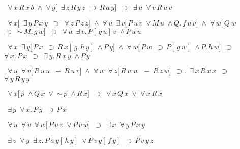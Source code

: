 \begin{description}
\item[\parbox{\textwidth}{X2114\index{X2114@X2114, {\bf Theorem}} }] \texttt{$ $ $\forall \,x \,R \,x \,b $ $\land $ $\forall \,y [ $ $\exists \,z \,R \,y \,z $ $\supset \,R \,a \,y ] $ $\supset $ $\exists \,u $ $\forall \,v \,R \,u \,v$}


\item[\parbox{\textwidth}{X2115\index{X2115@X2115, {\bf Theorem}} }] \texttt{$ $ $\forall \,x [ $ $\exists \,y \,P \,x \,y $ $\supset $ $\forall \,z \,P \,z \,z ] $ $\land $ $\forall \,u $ $\exists \,v [ \,P \,u \,v $ $\lor \,M \,u $ $\land \,Q . \,f \,u \,v ] $ $\land $ $\forall \,w [ \,Q \,w $ $\supset $ $\sim \,M . \,g \,w ] $ $\supset $ $\forall \,u $ $\exists \,v . \,P [ \,g \,u ] \,v $ $\land \,P \,u \,u$}


\item[\parbox{\textwidth}{X2116\index{X2116@X2116, {\bf Theorem}} }] \texttt{$ $ $\forall \,x $ $\exists \,y [ \,P \,x $ $\supset \,R \,x [ \,g . \,h \,y ] $ $\land \,P \,y ] $ $\land $ $\forall \,w [ \,P \,w $ $\supset \,P [ \,g \,w ] $ $\land \,P . \,h \,w ] $ $\supset $ $\forall \,x . \,P \,x $ $\supset $ $\exists \,y . \,R \,x \,y $ $\land \,P \,y$}


\item[\parbox{\textwidth}{X2117\index{X2117@X2117, {\bf Theorem}} }] \texttt{$ $ $\forall \,u $ $\forall \,v [ \,R \,u \,u $ $\equiv \,R \,u \,v ] $ $\land $ $\forall \,w $ $\forall \,z [ \,R \,w \,w $ $\equiv \,R \,z \,w ] $ $\supset . $ $\exists \,x \,R \,x \,x $ $\supset $ $\forall \,y \,R \,y \,y$}


\item[\parbox{\textwidth}{X2118\index{X2118@X2118, {\bf Theorem}} }] \texttt{$ $ $\forall \,x [ \,p $ $\land \,Q \,x $ $\lor $ $\sim \,p $ $\land \,R \,x ] $ $\supset $ $\forall \,x \,Q \,x $ $\lor $ $\forall \,x \,R \,x$}


\item[\parbox{\textwidth}{X2119\index{X2119@X2119, {\bf Theorem}} }] \texttt{$ $ $\exists \,y $ $\forall \,x . \,P \,y $ $\supset \,P \,x$}


\item[\parbox{\textwidth}{X2120\index{X2120@X2120, {\bf Theorem}} }] \texttt{$ $ $\forall \,u $ $\forall \,v $ $\forall \,w [ \,P \,u \,v $ $\lor \,P \,v \,w ] $ $\supset $ $\exists \,x $ $\forall \,y \,P \,x \,y$}


\item[\parbox{\textwidth}{X2121\index{X2121@X2121, {\bf Theorem}} }] \texttt{$ $ $\exists \,v $ $\forall \,y $ $\exists \,z . \,P \,a \,y [ \,h \,y ] $ $\lor \,P \,v \,y [ \,f \,y ] $ $\supset \,P \,v \,y \,z$}



\end{description}
